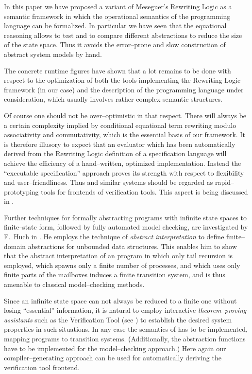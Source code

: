 \documentclass{entcs}
\begin{document}
In this paper we have proposed a variant of Meseguer's Rewriting Logic as a
semantic framework in which the operational semantics of the \Erlang programming 
language can be formalized. In particular we have seen that the equational 
reasoning
allows to test and to compare different abstractions to reduce the size of the
state space. Thus it avoids the error--prone and slow construction of abstract
system models by hand.

The concrete runtime figures have shown that a lot remains to be done with
respect to the optimization of both the tools implementing the Rewriting Logic
framework (\ELAN in our case) and the description of the programming language
under consideration, which usually involves rather complex semantic structures.

Of course one should not be over--optimistic in that respect. There will
always be a certain complexity implied by conditional equational term
rewriting modulo associativity and commutativity, which is the essential basis
of our framework. It is therefore illusory to expect that an evaluator which
has been automatically derived from the Rewriting Logic definition of a
specification language will achieve the efficiency of a hand--written,
optimized implementation. Instead the ``executable specification'' approach
proves its strength with respect to flexibility and user--friendliness. Thus
\ELAN and similar systems should be regarded as rapid--prototyping tools for
frontends of verification tools. This aspect is being discussed in \cite{LN99}.

Further techniques for formally abstracting \Erlang programs with infinite
state spaces to finite--state form, followed by fully automated model
checking, are investigated by F.~Huch in \cite{Huc99}. He employs the
technique of \emph{abstract interpretation} to define finite--domain
abstractions for unbounded data structures. This enables him to show that the
abstract interpretation of an \Erlang program in which only tail recursion is
employed, which spawns only a finite number of processes, and which uses only
finite parts of the mailboxes induces a finite transition system, and is thus
amenable to classical model--checking methods.

Since an infinite state space can not always be reduced to a finite one
without losing ``essential'' information, it is natural to employ interactive
\emph{theorem--proving assistants} such as the \EVT \Erlang Verification Tool
(see \cite{FGN01,NFG01,FGN02}) to establish the desired system properties
in such situations. In any case the semantics of \Erlang has to be
implemented, mapping \Erlang programs to transition systems. (Additionally,
the abstraction functions have to be implemented for the model--checking
approach.) Here again our compiler--generating approach can be used for
automatically deriving the verification tool frontend.





\end{document}
